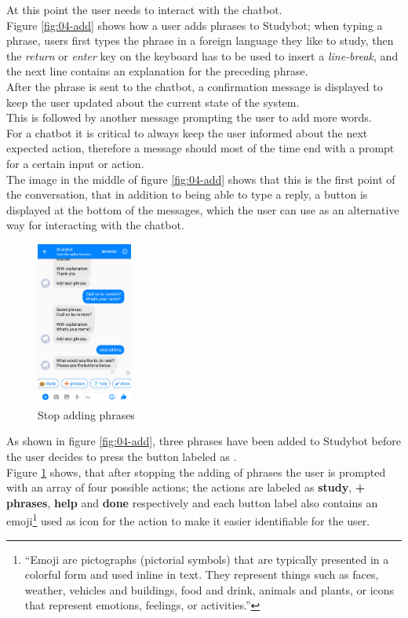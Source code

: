 At this point the user needs to interact with the chatbot.
\\
Figure \ref{fig:04-add} shows how a user adds phrases to Studybot;
when typing a phrase, users first types the phrase in a foreign language they like to study,
then the \emph{return} or \emph{enter} key on the keyboard has to be used to insert a \emph{line-break},
and the next line contains an explanation for the preceding phrase.
\\
After the phrase is sent to the chatbot,
a confirmation message is displayed to keep the user updated about the current state of the system.
\\
This is followed by another message prompting the user to add more words.
\\
For a chatbot it is critical to always keep the user informed about the next expected action,
therefore a message should most of the time end with a prompt for a certain input or action.
\\

The image in the middle of figure \ref{fig:04-add} shows that this is the first point of the conversation,
that in addition to being able to type a reply, a button is displayed at the bottom of the messages,
which the user can use as an alternative way for interacting with the chatbot.
\\

\begin{figure}
  \centering
  \includegraphics[width=0.28\textwidth]{images/interface/05-stop-adding.png}
	\caption{Stop adding phrases}
	\label{fig:05-stop-adding}
\end{figure}

As shown in figure \ref{fig:04-add}, three phrases have been added to Studybot
before the user decides to press the button labeled as .
\\
Figure \ref{fig:05-stop-adding} shows, that after stopping the adding of phrases the user is prompted with an array of four possible actions;
the actions are labeled as \textbf{study}, \textbf{+ phrases}, \textbf{help} and \textbf{done} respectively
and each button label also contains an emoji\footnote{``Emoji are pictographs (pictorial symbols) that are typically presented in a colorful form and used inline in text. They represent things such as faces, weather, vehicles and buildings, food and drink, animals and plants, or icons that represent emotions, feelings, or activities.''\cite{emoji}} used as icon for the action to make it easier identifiable for the user.
\\


